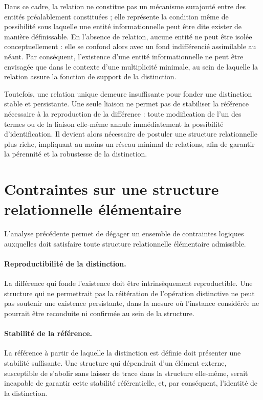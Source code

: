 \documentclass[11pt,a4paper]{article}
\begin{document}
Dans ce cadre, la relation ne constitue pas un mécanisme surajouté entre des entités préalablement constituées ; elle représente la condition même de possibilité sous laquelle une entité informationnelle peut être dite exister de manière définissable. En l’absence de relation, aucune entité ne peut être isolée conceptuellement : elle se confond alors avec un fond indifférencié assimilable au néant. Par conséquent, l’existence d’une entité informationnelle ne peut être envisagée que dans le contexte d’une multiplicité minimale, au sein de laquelle la relation assure la fonction de support de la distinction.

Toutefois, une relation unique demeure insuffisante pour fonder une distinction stable et persistante. Une seule liaison ne permet pas de stabiliser la référence nécessaire à la reproduction de la différence : toute modification de l’un des termes ou de la liaison elle-même annule immédiatement la possibilité d’identification. Il devient alors nécessaire de postuler une structure relationnelle plus riche, impliquant au moins un réseau minimal de relations, afin de garantir la pérennité et la robustesse de la distinction.

\section{Contraintes sur une structure relationnelle élémentaire}

L’analyse précédente permet de dégager un ensemble de contraintes logiques auxquelles doit satisfaire toute structure relationnelle élémentaire admissible.

\paragraph{Reproductibilité de la distinction.}
La différence qui fonde l’existence doit être intrinsèquement reproductible. Une structure qui ne permettrait pas la réitération de l’opération distinctive ne peut pas soutenir une existence persistante, dans la mesure où l’instance considérée ne pourrait être reconduite ni confirmée au sein de la structure.

\paragraph{Stabilité de la référence.}
La référence à partir de laquelle la distinction est définie doit présenter une stabilité suffisante. Une structure qui dépendrait d’un élément externe, susceptible de s’abolir sans laisser de trace dans la structure elle-même, serait incapable de garantir cette stabilité référentielle, et, par conséquent, l’identité de la distinction.
\end{document}
